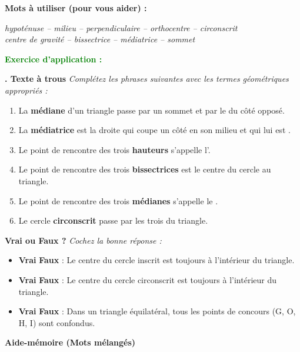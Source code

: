 \documentclass[12pt,a4paper]{article}
\newcounter{exerciceapp}
\newcommand{\exerciceapp}{%
  \refstepcounter{exerciceapp}%
  \textbf{\textcolor{green}{Exercice d'application \theexerciceapp :}} \ignorespaces
}
\begin{document}
\textbf{ Mots à utiliser (pour vous aider) :}
\begin{center}
    \textit{hypoténuse -- milieu -- perpendiculaire -- orthocentre -- circonscrit} \\
    \textit{centre de gravité -- bissectrice -- médiatrice -- sommet}
\end{center}

\textbf{\exerciceapp}

\vspace{0.8cm}

\textbf{. Texte à trous}
\textit{Complétez les phrases suivantes avec les termes géométriques appropriés :}

\begin{enumerate}
    \item La \textbf{médiane} d'un triangle passe par un sommet et par le \dotfill du côté opposé.
    \item La \textbf{médiatrice} est la droite qui coupe un côté en son milieu et qui lui est \dotfill.
    \item Le point de rencontre des trois \textbf{hauteurs} s'appelle l'\dotfill.
    \item Le point de rencontre des trois \textbf{bissectrices} est le centre du cercle \dotfill au triangle.
    \item Le point de rencontre des trois \textbf{médianes} s'appelle le \dotfill.
    \item Le cercle \textbf{circonscrit} passe par les trois \dotfill du triangle.
\end{enumerate}

\vspace{0.8cm}

\textbf{ Vrai ou Faux ?}
\textit{Cochez la bonne réponse :}

\begin{itemize}
    \item[$\square$] \textbf{Vrai} \quad [$\square$] \textbf{Faux} : Le centre du cercle inscrit est toujours à l'intérieur du triangle.
    \item[$\square$] \textbf{Vrai} \quad [$\square$] \textbf{Faux} : Le centre du cercle circonscrit est toujours à l'intérieur du triangle.
    \item[$\square$] \textbf{Vrai} \quad [$\square$] \textbf{Faux} : Dans un triangle équilatéral, tous les points de concours (G, O, H, I) sont confondus.
\end{itemize}

\vspace{0.8cm}

\textbf{ Aide-mémoire (Mots mélangés)}
\begin{center}
\end{center}
\end{document}
